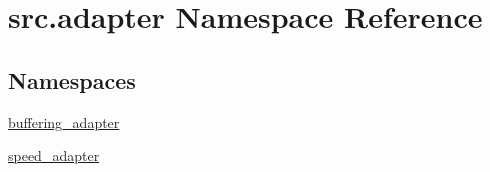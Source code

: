 \hypertarget{namespacesrc_1_1adapter}{}\section{src.\+adapter Namespace Reference}
\label{namespacesrc_1_1adapter}
\subsection*{Namespaces}
\begin{DoxyCompactItemize}
\item 
 \hyperlink{namespacesrc_1_1adapter_1_1buffering__adapter}{buffering\+\_\+adapter}
\item 
 \hyperlink{namespacesrc_1_1adapter_1_1speed__adapter}{speed\+\_\+adapter}
\end{DoxyCompactItemize}
